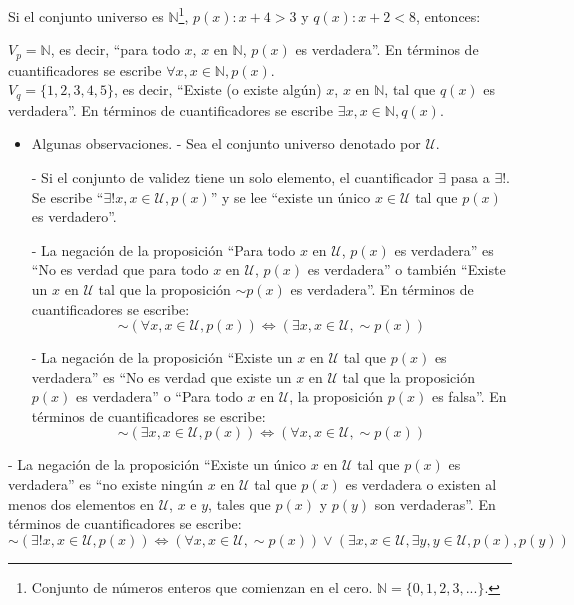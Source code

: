 \begin{myexample}
Si el conjunto universo es $\mathbb{N}$\footnote{Conjunto de números enteros que comienzan en el cero. $\mathbb{N}=\{0,1,2,3,...\}$.}, $p(x):x+4>3$ y $q(x):x+2<8$, entonces:
\end{myexample}

$V_{p}=\mathbb{N}$, es decir, ``para todo $x$, $x$ en $\mathbb{N}$, $p(x)$ es verdadera''. En términos de cuantificadores se escribe $\forall x,x\in\mathbb{N},p(x)$.\\

$V_{q}=\{1,2,3,4,5\}$, es decir, ``Existe (o existe algún) $x$, $x$ en $\mathbb{N}$, tal que $q(x)$ es verdadera''. En términos de cuantificadores se escribe $\exists x,x\in\mathbb{N},q(x)$.

\begin{itemize}
\item Algunas observaciones.
	\subitem - Sea el conjunto universo denotado por $\mathcal{U}$.
	
	\subitem - Si el conjunto de validez tiene un solo elemento, el cuantificador $\exists$ pasa a $\exists!$. Se escribe ``$\exists! x, x\in\mathcal{U},p(x)$'' y se lee ``existe un único $x\in\mathcal{U}$ tal que $p(x)$ es verdadero''.
	
	\subitem - La negación de la proposición  ``Para todo $x$ en $\mathcal{U}$, $p(x)$ es verdadera'' es ``No es verdad que para todo $x$ en $\mathcal{U}$, $p(x)$ es verdadera'' o también ``Existe un $x$ en $\mathcal{U}$ tal que la proposición $\sim p(x)$ es verdadera''. En términos de cuantificadores se escribe:
	\begin{equation}
	\sim(\forall x,x\in\mathcal{U},p(x))\Leftrightarrow(\exists x,x\in\mathcal{U},\sim p(x))
	\end{equation}
	
	\subitem - La negación de la proposición ``Existe un $x$ en $\mathcal{U}$ tal que $p(x)$ es verdadera'' es ``No es verdad que existe un $x$  en $\mathcal{U}$ tal que la proposición $p(x)$ es verdadera'' o ``Para todo $x$ en $\mathcal{U}$, la proposición $p(x)$ es falsa''. En términos de cuantificadores se escribe:
	\begin{equation}
	\sim(\exists x,x\in\mathcal{U},p(x))\Leftrightarrow(\forall x,x\in\mathcal{U},\sim p(x))
	\end{equation}
\end{itemize}

	\subitem - La negación de la proposición ``Existe un único $x$ en $\mathcal{U}$ tal que $p(x)$ es verdadera'' es ``no existe ningún $x$ en $\mathcal{U}$ tal que $p(x)$ es verdadera o existen al menos dos elementos en $\mathcal{U}$, $x$ e $y$, tales que $p(x)$ y $p(y)$ son verdaderas''. En términos de cuantificadores se escribe:
	\begin{equation}
	\sim(\exists!x,x\in\mathcal{U},p(x))\Leftrightarrow(\forall x,x\in\mathcal{U},\sim p(x))\vee(\exists x,x\in\mathcal{U},\exists y,y\in\mathcal{U},p(x),p(y))
	\end{equation}
	
